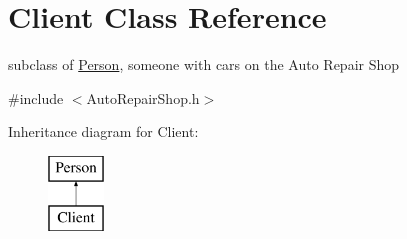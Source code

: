 \hypertarget{class_client}{}\section{Client Class Reference}
\label{class_client}


subclass of \hyperlink{class_person}{Person}, someone with cars on the Auto Repair Shop  




{\ttfamily \#include $<$Auto\+Repair\+Shop.\+h$>$}

Inheritance diagram for Client\+:\begin{figure}[H]
\begin{center}
\leavevmode
\includegraphics[height=2.000000cm]{class_client}
\end{center}
\end{figure}

